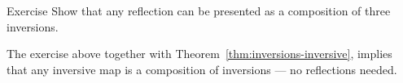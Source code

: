 \begin{thm}{Exercise}\label{ex:reflection/inversive}
Show that any reflection can be presented as a composition of three inversions. 
\end{thm}

The exercise above together with Theorem~\ref{thm:inversions-inversive},
implies that any inversive map is a composition of inversions ---
no reflections needed.

